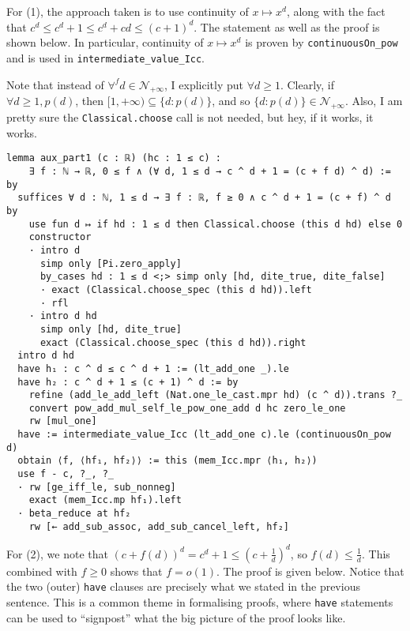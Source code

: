 For (1), the approach taken is to use continuity of \(x \mapsto x^d\), along with the fact that \(c^d \leq c^d + 1 \leq c^d + cd \leq (c + 1)^d\). The statement as well as the proof is shown below. In particular, continuity of \(x \mapsto x^d\) is proven by \texttt{continuousOn_pow} and is used in \texttt{intermediate_value_Icc}.

Note that instead of \(\forall^f d \in \mathcal{N}_{+\infty}\), I explicitly put \(\forall d \geq 1\). Clearly, if \(\forall d \geq 1, p(d)\), then \([1, +\infty) \subseteq \{d : p(d)\}\), and so \(\{d : p(d)\} \in \mathcal{N}_{+\infty}\). Also, I am pretty sure the \texttt{Classical.choose} call is not needed, but hey, if it works, it works.

\begin{verbatim}
lemma aux_part1 (c : ℝ) (hc : 1 ≤ c) :
    ∃ f : ℕ → ℝ, 0 ≤ f ∧ (∀ d, 1 ≤ d → c ^ d + 1 = (c + f d) ^ d) := by
  suffices ∀ d : ℕ, 1 ≤ d → ∃ f : ℝ, f ≥ 0 ∧ c ^ d + 1 = (c + f) ^ d by
    use fun d ↦ if hd : 1 ≤ d then Classical.choose (this d hd) else 0
    constructor
    · intro d
      simp only [Pi.zero_apply]
      by_cases hd : 1 ≤ d <;> simp only [hd, dite_true, dite_false]
      · exact (Classical.choose_spec (this d hd)).left
      · rfl
    · intro d hd
      simp only [hd, dite_true]
      exact (Classical.choose_spec (this d hd)).right
  intro d hd
  have h₁ : c ^ d ≤ c ^ d + 1 := (lt_add_one _).le
  have h₂ : c ^ d + 1 ≤ (c + 1) ^ d := by
    refine (add_le_add_left (Nat.one_le_cast.mpr hd) (c ^ d)).trans ?_
    convert pow_add_mul_self_le_pow_one_add d hc zero_le_one
    rw [mul_one]
  have := intermediate_value_Icc (lt_add_one c).le (continuousOn_pow d)
  obtain ⟨f, ⟨hf₁, hf₂⟩⟩ := this (mem_Icc.mpr ⟨h₁, h₂⟩)
  use f - c, ?_, ?_
  · rw [ge_iff_le, sub_nonneg]
    exact (mem_Icc.mp hf₁).left
  · beta_reduce at hf₂
    rw [← add_sub_assoc, add_sub_cancel_left, hf₂]
\end{verbatim}

For (2), we note that \((c + f(d))^d = c^d + 1 \leq \left(c + \frac{1}{d}\right)^d\), so \(f(d) \leq \frac{1}{d}\). This combined with \(f \geq 0\) shows that \(f = o(1)\). The proof is given below. Notice that the two (outer) \texttt{have} clauses are precisely what we stated in the previous sentence. This is a common theme in formalising proofs, where \texttt{have} statements can be used to ``signpost'' what the big picture of the proof looks like.

